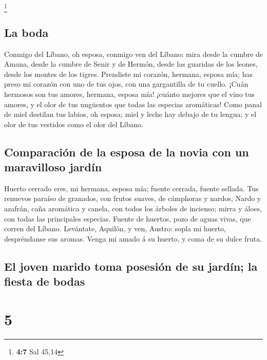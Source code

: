 \footnote{\textbf{4:7} Sal 45,14}

\hypertarget{la-boda}{%
\subsection{La boda}\label{la-boda}}

 Conmigo del Líbano, oh esposa, conmigo ven del Líbano:
mira desde la cumbre de Amana, desde la cumbre de Senir y de Hermón,
desde las guaridas de los leones, desde los montes de los tigres.
 Prendiste mi corazón, hermana, esposa mía; has preso mi
corazón con uno de tus ojos, con una gargantilla de tu cuello.
 ¡Cuán hermosos son tus amores, hermana, esposa mía!
¡cuánto mejores que el vino tus amores, y el olor de tus ungüentos que
todas las especias aromáticas!  Como panal de miel
destilan tus labios, oh esposa; miel y leche hay debajo de tu lengua; y
el olor de tus vestidos como el olor del Líbano.

\hypertarget{comparaciuxf3n-de-la-esposa-de-la-novia-con-un-maravilloso-jarduxedn}{%
\subsection{Comparación de la esposa de la novia con un maravilloso
jardín}\label{comparaciuxf3n-de-la-esposa-de-la-novia-con-un-maravilloso-jarduxedn}}

 Huerto cerrado eres, mi hermana, esposa mía; fuente
cerrada, fuente sellada.  Tus renuevos paraíso de
granados, con frutos suaves, de cámphoras y nardos, 
Nardo y azafrán, caña aromática y canela, con todos los árboles de
incienso; mirra y áloes, con todas las principales especias.
 Fuente de huertos, pozo de aguas vivas, que corren del
Líbano.  Levántate, Aquilón, y ven, Austro: sopla mi
huerto, despréndanse sus aromas. Venga mi amado á su huerto, y coma de
su dulce fruta.

\hypertarget{el-joven-marido-toma-posesiuxf3n-de-su-jarduxedn-la-fiesta-de-bodas}{%
\subsection{El joven marido toma posesión de su jardín; la fiesta de
bodas}\label{el-joven-marido-toma-posesiuxf3n-de-su-jarduxedn-la-fiesta-de-bodas}}

\hypertarget{section-4}{%
\section{5}\label{section-4}}


